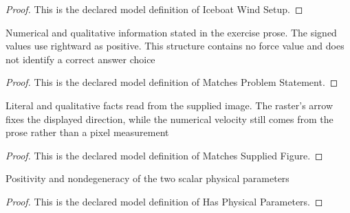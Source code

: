 \begin{proof}
  This is the declared model definition of Iceboat Wind Setup.
\end{proof}
\begin{definition}
  \label{def:physics:phyx-mini-0801:phyxminiproblems-problemphyxmini0801-matchesproblemstatement}
  Numerical and qualitative information stated in the exercise prose. The signed values use rightward as positive. This structure contains no force value and does not identify a correct answer choice
\end{definition}
\begin{proof}
  This is the declared model definition of Matches Problem Statement.
\end{proof}
\begin{definition}
  \label{def:physics:phyx-mini-0801:phyxminiproblems-problemphyxmini0801-matchessuppliedfigure}
  Literal and qualitative facts read from the supplied image. The raster's arrow fixes the displayed direction, while the numerical velocity still comes from the prose rather than a pixel measurement
\end{definition}
\begin{proof}
  This is the declared model definition of Matches Supplied Figure.
\end{proof}
\begin{definition}
  \label{def:physics:phyx-mini-0801:phyxminiproblems-problemphyxmini0801-hasphysicalparameters}
  Positivity and nondegeneracy of the two scalar physical parameters
\end{definition}
\begin{proof}
  This is the declared model definition of Has Physical Parameters.
\end{proof}

